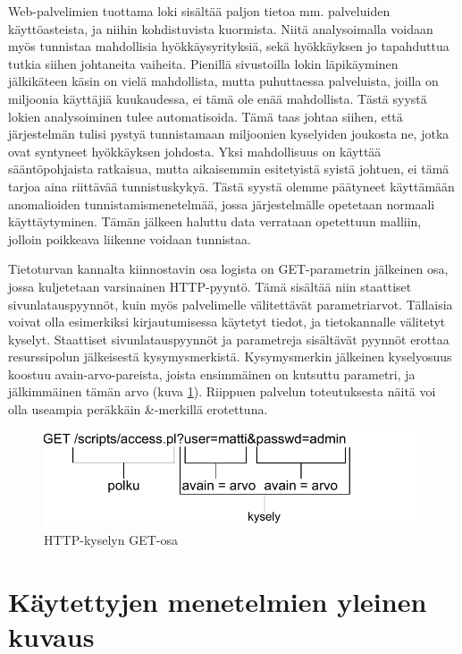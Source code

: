Web-palvelimien tuottama loki sisältää paljon tietoa mm. palveluiden käyttöasteista, ja niihin kohdistuvista kuormista. Niitä analysoimalla voidaan myös tunnistaa mahdollisia hyökkäysyrityksiä, sekä
hyökkäyksen jo tapahduttua tutkia siihen johtaneita vaiheita. Pienillä sivustoilla lokin läpikäyminen jälkikäteen käsin on vielä mahdollista, mutta puhuttaessa palveluista, joilla on miljoonia käyttäjiä 
kuukaudessa, ei tämä ole enää mahdollista. Tästä syystä lokien analysoiminen tulee automatisoida. Tämä taas johtaa siihen, että järjestelmän tulisi pystyä tunnistamaan miljoonien kyselyiden joukosta
ne, jotka ovat syntyneet hyökkäyksen johdosta. Yksi mahdollisuus on käyttää sääntöpohjaista ratkaisua, mutta aikaisemmin esitetyistä syistä johtuen, ei tämä tarjoa aina riittävää tunnistuskykyä. Tästä 
syystä olemme päätyneet käyttämään anomalioiden tunnistamismenetelmää, jossa järjestelmälle opetetaan normaali käyttäytyminen. Tämän jälkeen haluttu data verrataan opetettuun malliin, jolloin poikkeava
liikenne voidaan tunnistaa.

Tietoturvan kannalta kiinnostavin osa logista on GET-parametrin jälkeinen osa, jossa kuljetetaan varsinainen HTTP-pyyntö. Tämä sisältää niin staattiset sivunlatauspyynnöt, kuin myös palvelimelle 
välitettävät parametriarvot. Tällaisia voivat olla esimerkiksi kirjautumisessa käytetyt tiedot, ja tietokannalle välitetyt kyselyt. Staattiset sivunlatauspyynnöt ja parametreja sisältävät pyynnöt erottaa
resurssipolun jälkeisestä kysymysmerkistä. Kysymysmerkin jälkeinen kyselyosuus koostuu avain-arvo-pareista, joista ensimmäinen on kutsuttu parametri, ja jälkimmäinen tämän arvo (kuva \ref{CLF2}). Riippuen
palvelun toteutuksesta näitä voi olla useampia peräkkäin \&-merkillä erotettuna.

\begin{figure}[ht]
\centering
\includegraphics[width=13cm]{pics/logi2.pdf}
\caption{HTTP-kyselyn GET-osa}
\label{CLF2}
\end{figure}

\section{Käytettyjen menetelmien yleinen kuvaus}

